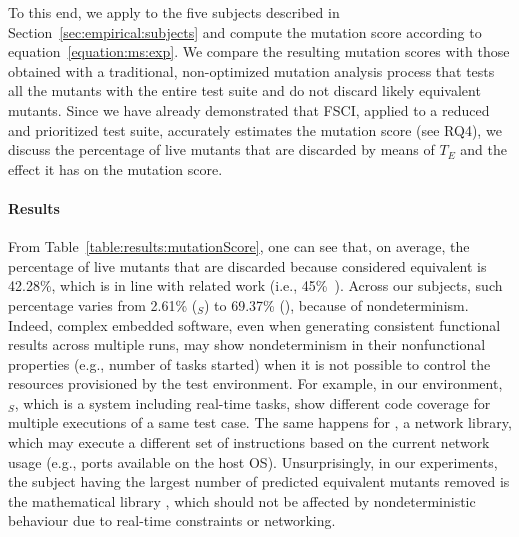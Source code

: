 
To this end, we apply \APPR to the five subjects  described in Section~\ref{sec:empirical:subjects} and compute the mutation score according to equation~\ref{equation:ms:exp}.
 We compare the resulting mutation scores with those obtained with a traditional, non-optimized mutation analysis process that tests all the mutants with the entire test suite and do not discard likely equivalent mutants.
Since we have already demonstrated that FSCI, applied to a reduced and prioritized test suite, accurately estimates the mutation score (see RQ4), 
we discuss the percentage of live mutants that are discarded by means of $T_E$ and the effect it has on the mutation score.




\paragraph{Results}
From Table~\ref{table:results:mutationScore}, one can see that, on average, the percentage of live mutants that are discarded because considered equivalent is 42.28\%, which is in line with related work (i.e., 45\%~\cite{zhang2013faster}). Across our subjects, such percentage varies from 2.61\% (\SAIL{}$_S$) to 69.37\% (\MLFS{}{}), because of nondeterminism.
Indeed, complex embedded software, even when generating consistent functional results across multiple runs, may show nondeterminism 
in their nonfunctional properties (e.g., number of tasks started) 
when it is not possible to control the resources provisioned by the test environment.
For example, in our environment, \SAIL{}$_S$, which is a system including real-time tasks, show different code coverage for multiple executions of a same test case. The same happens for \GCSP{}, a network library, which may execute 
a different set of instructions
based on the current network usage (e.g., ports available on the host OS). 
Unsurprisingly, in our experiments, the subject having the largest number of predicted equivalent mutants removed is the mathematical library \MLFS{}{}, which should not be affected by nondeterministic behaviour due to real-time constraints or networking. 

